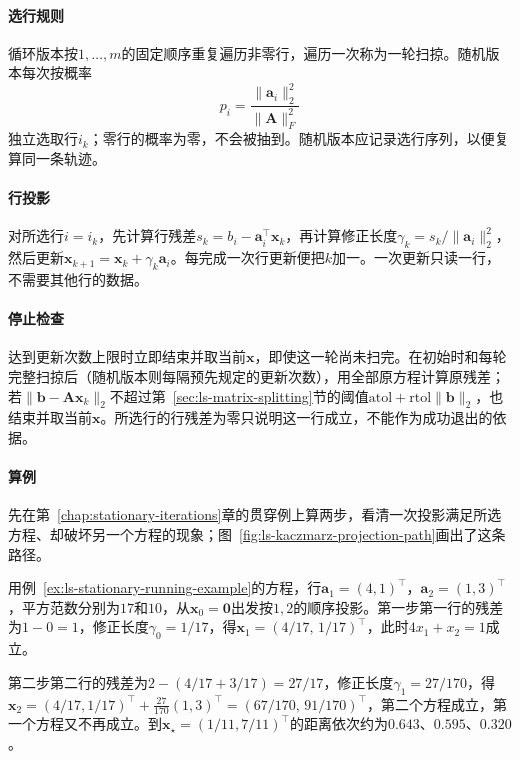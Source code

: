 \paragraph{选行规则}
循环版本按$1,\ldots,m$的固定顺序重复遍历非零行，遍历一次称为一轮扫掠。随机版本每次按概率
\[
 p_i=\frac{\lVert\bm a_i\rVert_2^2}{\lVert\bm A\rVert_F^2}
\]
独立选取行$i_k$；零行的概率为零，不会被抽到。随机版本应记录选行序列，以便复算同一条轨迹。

\paragraph{行投影}
对所选行$i=i_k$，先计算行残差$s_k=b_i-\bm a_i^\top\bm x_k$，再计算修正长度$\gamma_k=s_k/\lVert\bm a_i\rVert_2^2$，然后更新$\bm x_{k+1}=\bm x_k+\gamma_k\bm a_i$。每完成一次行更新便把$k$加一。一次更新只读一行，不需要其他行的数据。

\paragraph{停止检查}
达到更新次数上限时立即结束并取当前$\bm x$，即使这一轮尚未扫完。在初始时和每轮完整扫掠后（随机版本则每隔预先规定的更新次数），用全部原方程计算原残差；若$\lVert\bm b-\bm A\bm x_k\rVert_2$不超过第~\ref{sec:ls-matrix-splitting}节的阈值$\mathrm{atol}+\mathrm{rtol}\lVert\bm b\rVert_2$，也结束并取当前$\bm x$。所选行的行残差为零只说明这一行成立，不能作为成功退出的依据。

\paragraph{算例}
先在第~\ref{chap:stationary-iterations}章的贯穿例上算两步，看清一次投影满足所选方程、却破坏另一个方程的现象；图~\ref{fig:ls-kaczmarz-projection-path}画出了这条路径。

\begin{example}[Kaczmarz算法的前两步]
\label{ex:ls-kaczmarz-two-steps}
用例~\ref{ex:ls-stationary-running-example}的方程，行$\bm a_1=(4,1)^\top$，$\bm a_2=(1,3)^\top$，平方范数分别为$17$和$10$，从$\bm x_0=\bm 0$出发按$1,2$的顺序投影。第一步第一行的残差为$1-0=1$，修正长度$\gamma_0=1/17$，得$\bm x_1=(4/17,\,1/17)^\top$，此时$4x_1+x_2=1$成立。

第二步第二行的残差为$2-(4/17+3/17)=27/17$，修正长度$\gamma_1=27/170$，得$\bm x_2=(4/17,1/17)^\top+\tfrac{27}{170}(1,3)^\top=(67/170,\,91/170)^\top$，第二个方程成立，第一个方程又不再成立。到$\bm x_\star=(1/11,7/11)^\top$的距离依次约为$0.643$、$0.595$、$0.320$。
\end{example}

